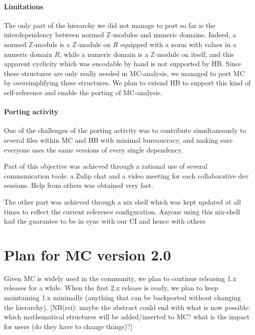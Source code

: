 \documentclass{easychair}
\def\MC{{\sf MC}}
\def\HB{{\sf HB}}
\begin{document}
\paragraph{Limitations}

The only part of the hierarchy we did not manage to port so far is the
interdependency between normed $\mathbb{Z}$-modules and numeric domains.
Indeed, a normed $\mathbb{Z}$-module is a $\mathbb{Z}$-module on $R$
equipped with a norm with values in a numeric domain $R$,
while a numeric domain is a $\mathbb{Z}$-module on itself, and this apparent
cyclicity which was encodable by hand is not supported by \HB{}.
Since these structures are only really needed in \MC{}-analysis,
we managed to port \MC{} by oversimplifying these structures.
We plan to extend \HB{} to support this kind of self-reference
and enable the porting of \MC{}-analysis.

\paragraph{Porting activity}

One of the challenges of the porting activity was to contribute simultaneously
to several files within \MC{} and \HB{} with minimal bureaucracy, and making sure
everyone uses the same versions of every single dependency.

Part of this objective was achieved through a rational use of several
communication tools: a Zulip chat and a video meeting for each
collaborative dev sessions. Help from others was obtained very fast.

The other part was achieved through a nix shell which was kept updated
at all times to reflect the current reference configuration.
Anyone using this nix-shell had the guarantee to be in sync with our CI
and hence with others

\section{Plan for \MC{} version 2.0}

Given \MC{} is widely used in the community, we plan to continue releasing 1.x
releases for a while. When the first 2.x release is ready, we plan to
keep maintaining 1.x minimally (anything that can be backported without changing the hierarchy).
[NB(rei): maybe the abstract could end with what is now possible:
which mathematical structures will be added/inserted to MC? what is the impact for
users (do they have to change things)?]

\label{sect:bib}

%
%
%


\end{document}
